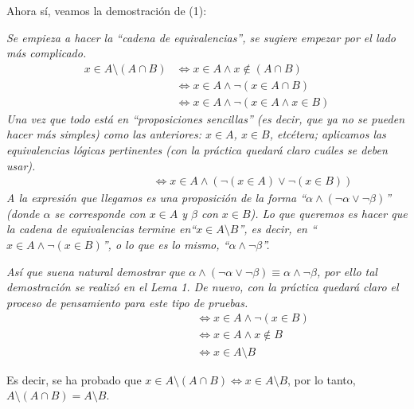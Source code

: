 \documentclass[letterpaper,DIV=12,headsepline,12pt]{scrartcl}
\makeatletter
\renewenvironment{proof}[1][]{%
        \par\pushQED{\qed}%
        \normalfont\topsep6pt \partopsep0pt %
        \trivlist
        \item[\hskip\labelsep
                \textbf{\textit{Demostración.}}%
        ]#1
        }{%
        \popQED\endtrivlist\@endpefalse
    }
\makeatother
\begin{document}
    Ahora sí, veamos la demostración de (1):

    \begin{proof}
        \textcolor{black!67}{\itshape Se empieza a hacer la ``cadena de equivalencias'', se sugiere empezar por el lado \textit{más complicado}.}
        \begin{align*}
            x \in A \setminus (A \cap B) & \Leftrightarrow x \in A \land x \notin (A \cap B) \tag*{Def. de \( \setminus \)} \\
            & \Leftrightarrow x \in A \land \lnot (x \in A \cap B) \tag*{Def. de \( \notin \)} \\
            & \Leftrightarrow x \in A \land \lnot(x \in A \land x \in B) \tag*{Def. de \( \cap \)}
        \end{align*}
        \textcolor{black!67}{\itshape Una vez que todo está en ``proposiciones sencillas'' (es decir, que ya no se pueden hacer más simples) como las anteriores: \(x \in A\), \(x \in B\), etcétera; aplicamos las equivalencias lógicas pertinentes (con la práctica quedará claro cuáles se deben usar).}
        \begin{align*}
            \phantom{x \in A \setminus (A \cap B)} & \Leftrightarrow x \in A \land (\lnot(x \in A) \lor \lnot(x \in B)) \tag*{Leyes de De Morgan}            
        \end{align*}
        \textcolor{black!67}{\itshape A la expresión que llegamos es una proposición de la forma ``\(\alpha \land (\lnot \alpha \lor \lnot \beta) \)'' (donde \(\alpha\) se corresponde con \(x \in A\) y \(\beta\) con \(x \in B\)). Lo que queremos es hacer que la cadena de equivalencias termine en``\(x \in A \setminus B\)'', es decir, en ``\(x \in A \land \lnot(x \in B)\)'', o lo que es lo mismo, ``\(\alpha \land \lnot \beta\)''.}
        
        \textcolor{black!67}{\itshape Así que suena natural demostrar que \(\alpha \land (\lnot \alpha \lor \lnot \beta) \equiv \alpha \land \lnot \beta\), por ello tal demostración se realizó en el Lema 1. De nuevo, con la práctica quedará claro el proceso de pensamiento para este tipo de pruebas.}
        \begin{align*}
            \phantom{x \in A \setminus (A \cap B)} & \Leftrightarrow x \in A \land \lnot(x \in B) \tag*{Por el Lema 1} \\
            & \Leftrightarrow x \in A \land x \notin B \tag*{Def. de \( \notin \)} \\
            & \Leftrightarrow x \in A \setminus B \tag*{Def. de \( \setminus \)}
        \end{align*}

        Es decir, se ha probado que \(x \in A \setminus (A \cap B) \Leftrightarrow x \in A \setminus B\), por lo tanto, $A \setminus (A \cap B) = A \setminus B$.
    \end{proof}
\end{document}
